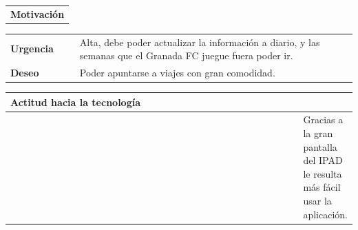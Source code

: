 \documentclass[11pt]{article}
\begin{document}
\begin{table}[H]
  \begin{tabular}{l}
    \textbf{Motivación} 
  \end{tabular}

  \begin{tabular}{p{0.2\linewidth}|p{0.8\linewidth}}
    \toprule
    \textbf{Urgencia} & Alta, debe poder actualizar la información a diario, y las semanas que el Granada FC juegue fuera poder ir. &\\
    \textbf{Deseo}  & Poder apuntarse a viajes con gran comodidad. &\\
    \bottomrule
  \end{tabular}

  \begin{tabular}{p{1.028\linewidth}}
    \textbf{Actitud hacia la tecnología}\\
    \midrule
    & Gracias a la gran pantalla del IPAD le resulta más fácil usar la aplicación. &
  \end{tabular}
\end{table}
\end{document}
